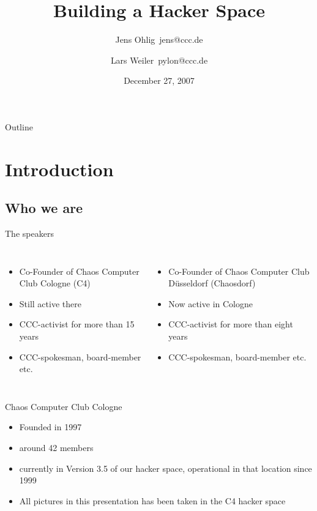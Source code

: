 \documentclass[mathserif]{beamer}
\title[A Hacker Space Design Pattern Catalogue]{\textbf{Building a Hacker Space}}
\author[J.~Ohlig, L.~Weiler]{%
	Jens Ohlig~\flq jens@ccc.de\frq \and Lars Weiler~\flq pylon@ccc.de\frq}
\institute[24C3]{24th Chaos Communication Congress}
\date[]{December 27, 2007}
\newenvironment{itemizeframe}[1]
	{\begin{frame}{#1}\startitemizeframe}
	{\stopitemizeframe\end{frame}}
\newcommand\startitemizeframe{\begin{itemize}}
\newcommand\stopitemizeframe{\end{itemize}}
\begin{document}
\begin{frame}
  \titlepage
\end{frame}


\begin{frame}{Outline}
  \tableofcontents[hideallsubsections]
\end{frame}

\section{Introduction}

\subsection{Who we are}

\begin{frame}{The speakers}
	\begin{columns}
		\begin{itemize}
			\item Co-Founder of Chaos Computer Club Cologne (C4)
			\item Still active there
			\item CCC-activist for more than 15 years
			\item CCC-spokesman, board-member etc.
		\end{itemize}
		\begin{itemize}
			\item Co-Founder of Chaos Computer Club Düsseldorf (Chaosdorf)
			\item Now active in Cologne
			\item CCC-activist for more than eight years
			\item CCC-spokesman, board-member etc.
		\end{itemize}
	\end{columns}
\end{frame}

\begin{itemizeframe}{Chaos Computer Club Cologne}
	\item Founded in 1997
	\item around 42 members
	\item currently in Version 3.5 of our hacker space, operational in that
		location since 1999
	\item All pictures in this presentation has been taken in the C4 hacker space
\end{itemizeframe}
\end{document}

